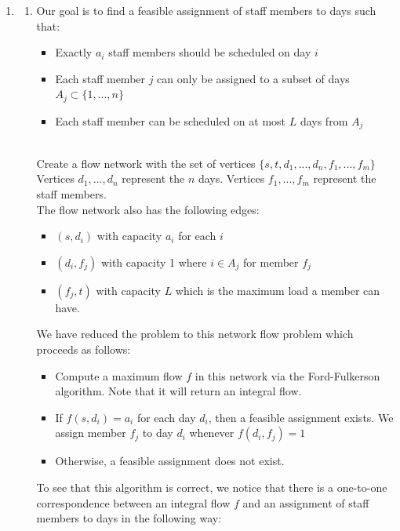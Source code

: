 \documentclass{article}
\begin{document}
\begin{enumerate}
    \newpage
    \item %
    \begin{enumerate}
        \item Our goal is to find a feasible assignment of staff members to days such that:
        \begin{itemize}
            \item Exactly $a_i$ staff members should be scheduled on day $i$
            \item Each staff member $j$ can only be assigned to a subset of days $A_j \subset \{1, ..., n\}$
            \item Each staff member can be scheduled on at most $L$ days from $A_j$
        \end{itemize}
        \\
        Create a flow network with the set of vertices $\{s, t, d_1, ..., d_n, f_1, ..., f_m\}$\\
        Vertices $d_1, ..., d_n$ represent the $n$ days. Vertices $f_1, ..., f_m$ represent the staff members.\\
        The flow network also has the following edges:
        \begin{itemize}
            \item $(s, d_i)$ with capacity $a_i$ for each $i$
            \item $(d_i, f_j)$ with capacity 1 where $i \in A_j$ for member $f_j$
            \item $(f_j, t)$ with capacity $L$ which is the maximum load a member can have.
        \end{itemize}
        We have reduced the problem to this network flow problem which proceeds as follows:
        \begin{itemize}
            \item Compute a maximum flow $f$ in this network via the Ford-Fulkerson algorithm. Note that it will return an integral flow.
            \item If $f(s, d_i) = a_i$ for each day $d_i$, then a feasible assignment exists. We assign member $f_j$ to day $d_i$ whenever $f(d_i, f_j) = 1$
            \item Otherwise, a feasible assignment does not exist.
        \end{itemize}
        To see that this algorithm is correct, we notice that there is a one-to-one correspondence between an integral flow $f$ and an assignment of staff members to days in the following way:
        \begin{itemize}

\end{itemize}
\end{enumerate}
\end{enumerate}
\end{document}
